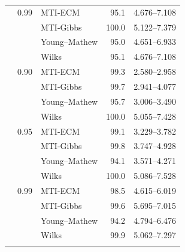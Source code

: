 \begin{longtable}{@{}rrlrr@{}}
\addlinespace[0.3em]
500 & 0.99 & MTI-ECM & 95.1 & 4.676--7.108 \\
 &  & MTI-Gibbs & 100.0 & 5.122--7.379 \\
 &  & Young--Mathew & 95.0 & 4.651--6.933 \\
 &  & Wilks & 95.1 & 4.676--7.108 \\
\addlinespace[0.3em]
1000 & 0.90 & MTI-ECM & 99.3 & 2.580--2.958 \\
 &  & MTI-Gibbs & 99.7 & 2.941--4.077 \\
 &  & Young--Mathew & 95.7 & 3.006--3.490 \\
 &  & Wilks & 100.0 & 5.055--7.428 \\
\addlinespace[0.3em]
1000 & 0.95 & MTI-ECM & 99.1 & 3.229--3.782 \\
 &  & MTI-Gibbs & 99.8 & 3.747--4.928 \\
 &  & Young--Mathew & 94.1 & 3.571--4.271 \\
 &  & Wilks & 100.0 & 5.086--7.528 \\
\addlinespace[0.3em]
1000 & 0.99 & MTI-ECM & 98.5 & 4.615--6.019 \\
 &  & MTI-Gibbs & 99.6 & 5.695--7.015 \\
 &  & Young--Mathew & 94.2 & 4.794--6.476 \\
 &  & Wilks & 99.9 & 5.062--7.297 \\
\addlinespace[0.3em]
\end{longtable}
\clearpage
